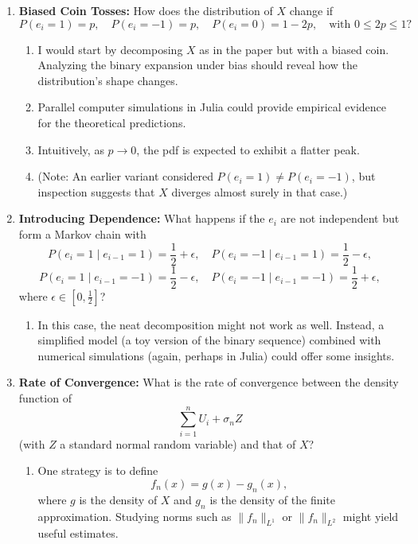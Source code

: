 \documentclass{article}
\begin{document}
\begin{enumerate}
    \item \textbf{Biased Coin Tosses:} How does the distribution of \(X\) change if 
    \[
    P(e_i = 1) = p,\quad P(e_i = -1) = p,\quad P(e_i = 0) = 1-2p, \quad\text{with } 0 \le 2p \le 1?
    \]
    \begin{enumerate}
        \item I would start by decomposing \(X\) as in the paper but with a biased coin. Analyzing the binary expansion under bias should reveal how the distribution’s shape changes. 
        \item Parallel computer simulations in Julia could provide empirical evidence for the theoretical predictions.
        \item Intuitively, as \(p \to 0\), the pdf is expected to exhibit a flatter peak.
        \item (Note: An earlier variant considered \(P(e_i = 1) \neq P(e_i = -1)\), but inspection suggests that \(X\) diverges almost surely in that case.)
    \end{enumerate}
    
    \item \textbf{Introducing Dependence:} What happens if the \(e_i\) are not independent but form a Markov chain with
    \[
    P(e_i=1 \mid e_{i-1}=1) = \frac{1}{2} + \epsilon,\quad P(e_i=-1 \mid e_{i-1}=1) = \frac{1}{2} - \epsilon,
    \]
    \[
    P(e_i=1 \mid e_{i-1}=-1) = \frac{1}{2} - \epsilon,\quad P(e_i=-1 \mid e_{i-1}=-1) = \frac{1}{2} + \epsilon,
    \]
    where \(\epsilon \in [0,\frac{1}{2}]\)?
    \begin{enumerate}
        \item In this case, the neat decomposition might not work as well. Instead, a simplified model (a toy version of the binary sequence) combined with numerical simulations (again, perhaps in Julia) could offer some insights.
    \end{enumerate}
    
    \item \textbf{Rate of Convergence:} What is the rate of convergence between the density function of
    \[
    \sum_{i=1}^{n} U_i + \sigma_n Z
    \]
    (with \(Z\) a standard normal random variable) and that of \(X\)?
    \begin{enumerate}
        \item One strategy is to define 
        \[
        f_n(x) = g(x) - g_n(x),
        \]
        where \(g\) is the density of \(X\) and \(g_n\) is the density of the finite approximation. Studying norms such as \(\|f_n\|_{L^1}\) or \(\|f_n\|_{L^2}\) might yield useful estimates.
    \end{enumerate}
    

\end{enumerate}
\end{document}
